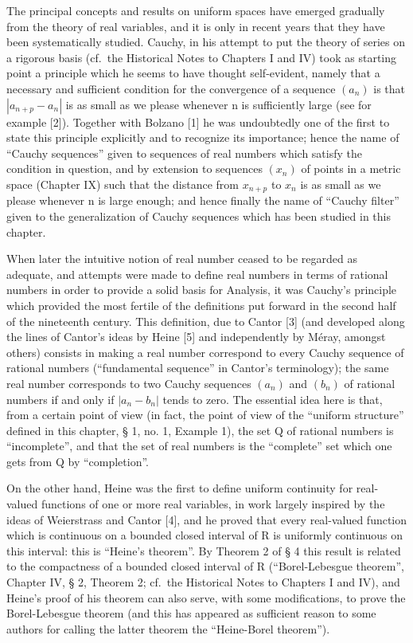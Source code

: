 The principal concepts and results on uniform spaces have emerged gradually from the theory of real variables, and it is only in recent years that they have been systematically studied. Cauchy, in his attempt to put the theory of series on a rigorous basis (cf.~the Historical Notes to Chapters I and IV) took as starting point a principle which he seems to have thought self-evident, namely that a necessary and sufficient condition for the convergence of a sequence \((a_{n})\) is that \(|a_{n+p} - a_{n}|\) is as small as we please whenever n is sufficiently large (see for example {[}2{]}). Together with Bolzano {[}1{]} he was undoubtedly one of the first to state this principle explicitly and to recognize its importance; hence the name of ``Cauchy sequences'' given to sequences of real numbers which satisfy the condition in question, and by extension to sequences \((x_{n})\) of points in a metric space (Chapter IX) such that the distance from \(x_{n+p}\) to \(x_{n}\) is as small as we please whenever n is large enough; and hence finally the name of ``Cauchy filter'' given to the generalization of Cauchy sequences which has been studied in this chapter.

When later the intuitive notion of real number ceased to be regarded as adequate, and attempts were made to define real numbers in terms of rational numbers in order to provide a solid basis for Analysis, it was Cauchy's principle which provided the most fertile of the definitions put forward in the second half of the nineteenth century. This definition, due to Cantor {[}3{]} (and developed along the lines of Cantor's ideas by Heine {[}5{]} and independently by Méray, amongst others) consists in making a real number correspond to every Cauchy sequence of rational numbers (``fundamental sequence'' in Cantor's terminology); the same real number corresponds to two Cauchy sequences \((a_{n})\) and \((b_{n})\) of rational numbers if and only if \(|a_{n} - b_{n}|\) tends to zero. The essential idea here is that, from a certain point of view (in fact, the point of view of the ``uniform structure'' defined in this chapter, § 1, no. 1, Example 1), the set Q of rational numbers is ``incomplete'', and that the set of real numbers is the ``complete'' set which one gets from Q by ``completion''.

On the other hand, Heine was the first to define uniform continuity for real-valued functions of one or more real variables, in work largely inspired by the ideas of Weierstrass and Cantor {[}4{]}, and he proved that every real-valued function which is continuous on a bounded closed interval of R is uniformly continuous on this interval: this is ``Heine's theorem''. By Theorem 2 of § 4 this result is related to the compactness of a bounded closed interval of R (``Borel-Lebesgue theorem'', Chapter IV, § 2, Theorem 2; cf.~the Historical Notes to Chapters I and IV), and Heine's proof of his theorem can also serve, with some modifications, to prove the Borel-Lebesgue theorem (and this has appeared as sufficient reason to some authors for calling the latter theorem the ``Heine-Borel theorem'').

